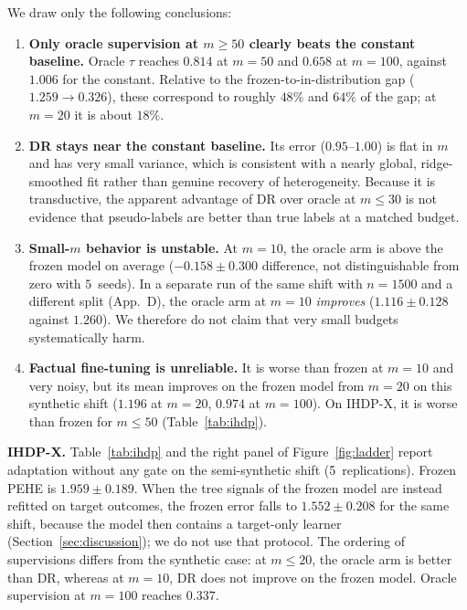 \documentclass[pdflatex,sn-mathphys-num]{sn-jnl}
\begin{document}
We draw only the following conclusions:
\begin{enumerate}
  \item \textbf{Only oracle supervision at $m\ge 50$ clearly beats the constant baseline.} Oracle $\tau$ reaches $0.814$ at $m=50$ and $0.658$ at $m=100$, against $1.006$ for the constant. Relative to the frozen-to-in-distribution gap ($1.259\to0.326$), these correspond to roughly $48\%$ and $64\%$ of the gap; at $m=20$ it is about $18\%$.
  \item \textbf{DR stays near the constant baseline.} Its error ($0.95$--$1.00$) is flat in $m$ and has very small variance, which is consistent with a nearly global, ridge-smoothed fit rather than genuine recovery of heterogeneity. \newpage Because it is transductive, the apparent advantage of DR over oracle at $m\le 30$ is not evidence that pseudo-labels are better than true labels at a matched budget.
  \item \textbf{Small-$m$ behavior is unstable.} At $m=10$, the oracle arm is above the frozen model on average ($-0.158\pm0.300$ difference, not distinguishable from zero with $5$~seeds). In a separate run of the same shift with $n=1500$ and a different split (App.~D), the oracle arm at $m=10$ \emph{improves} ($1.116\pm0.128$ against $1.260$). We therefore do not claim that very small budgets systematically harm.
  \item \textbf{Factual fine-tuning is unreliable.} It is worse than frozen at $m=10$ and very noisy, but its mean improves on the frozen model from $m=20$ on this synthetic shift ($1.196$ at $m=20$, $0.974$ at $m=100$). On IHDP-X, it is worse than frozen for $m\le 50$ (Table~\ref{tab:ihdp}).
\end{enumerate}

\medskip\noindent\textbf{IHDP-X.} Table~\ref{tab:ihdp} and the right panel of Figure~\ref{fig:ladder} report adaptation without any gate on the semi-synthetic shift (5~replications). Frozen PEHE is $1.959\pm0.189$. When the tree signals of the frozen model are instead refitted on target outcomes, the frozen error falls to $1.552\pm0.208$ for the same shift, because the model then contains a target-only learner (Section~\ref{sec:discussion}); we do not use that protocol. The ordering of supervisions differs from the synthetic case: at $m\le 20$, the oracle arm is better than DR, whereas at $m=10$, DR does not improve on the frozen model. Oracle supervision at $m=100$ reaches $0.337$.
\end{document}
